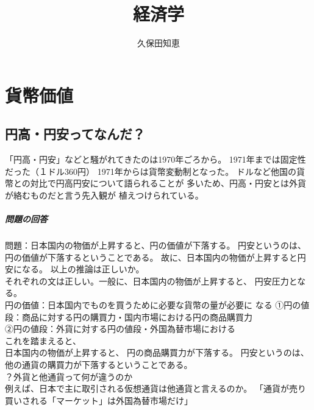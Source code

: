 \documentclass{jsarticle}
\begin{document}
\title{経済学}
\author{久保田知恵}
\maketitle

\section{貨幣価値}
\subsection{円高・円安ってなんだ？}
「円高・円安」などと騒がれてきたのは1970年ごろから。
1971年までは固定性だった（１ドル360円）
1971年からは貨幣変動制となった。
ドルなど他国の貨幣との対比で円高円安について語られることが
多いため、円高・円安とは外貨が絡むものだと言う先入観が
植えつけられている。\\
\subparagraph{問題の回答}
問題：日本国内の物価が上昇すると、円の価値が下落する。
円安というのは、円の価値が下落するということである。
故に、日本国内の物価が上昇すると円安になる。
以上の推論は正しいか。\\
それぞれの文は正しい。一般に、日本国内の物価が上昇すると、
円安圧力となる。\\
円の価値：日本国内でものを買うために必要な貨幣の量が必要に
なる
①円の値段：商品に対する円の購買力・国内市場における円の商品購買力\\
②円の値段：外貨に対する円の値段・外国為替市場における\\
これを踏まえると、\\
日本国内の物価が上昇すると、
円の商品購買力が下落する。
円安というのは、他の通貨の購買力が下落するということである。\\



？外貨と他通貨って何が違うのか\\
例えば、日本で主に取引される仮想通貨は他通貨と言えるのか。
「通貨が売り買いされる「マーケット」は外国為替市場だけ」
\end{document}
